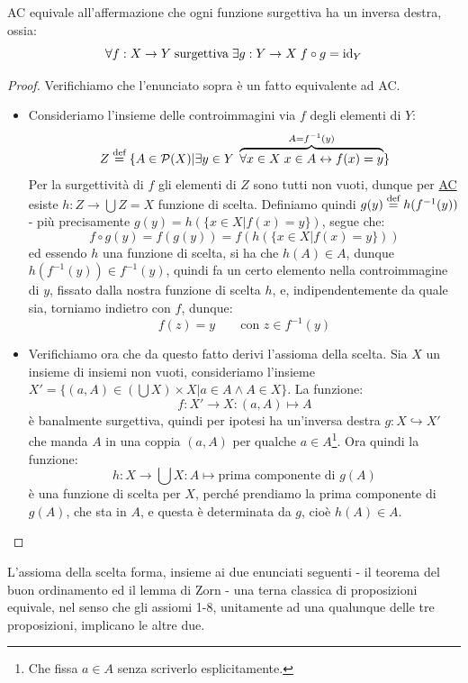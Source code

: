 \begin{note}
	AC equivale all'affermazione che ogni funzione surgettiva ha un inversa destra, ossia:
	\[ \forall f : X \rightarrow Y \; \text{surgettiva}\;\exists g : Y \rightarrow X \; f \circ g = \operatorname{id}_Y
		\]
\end{note}

\begin{proof}
	Verifichiamo che l'enunciato sopra \`e un fatto equivalente ad AC.
	\begin{itemize}
		\item[$\boxed{\Longrightarrow}$] Consideriamo l'insieme delle controimmagini via $f$ degli elementi di $Y$:
		\[ Z \overset{\text{def}}{=} \{A \in \mathcal{P}(X) | \exists y \in Y \; \overbrace{\forall x \in X \; x \in A \leftrightarrow f(x) = y}^{A = f^{-1}(y)}\}
			\]
		Per la surgettivit\`a di $f$ gli elementi di $Z$ sono tutti non vuoti, dunque per \hyperref[ax9]{AC} esiste $h : Z \rightarrow \bigcup Z = X$ funzione di scelta.
		Definiamo quindi $g(y) \overset{\text{def}}{=} h(f^{-1}(y))$ - pi\`u precisamente $g(y) = h(\{x \in X | f(x)  = y\})$, segue che:
		\[ f \circ g(y) = f(g(y)) = f(h(\{x \in X | f(x)  = y\}))
			\]
		ed essendo $h$ una funzione di scelta, si ha che $h(A) \in A$, dunque $h(f^{-1}(y)) \in f^{-1}(y)$, quindi fa un certo elemento nella controimmagine di $y$, fissato dalla nostra funzione di scelta $h$, e, indipendentemente da quale sia, torniamo indietro con $f$, dunque:
		\[ f(z) = y \qquad \text{con $z \in f^{-1}(y)$}
			\]
		\item[$\boxed{\Longleftarrow}$] Verifichiamo ora che da questo fatto derivi l'assioma della scelta. Sia $X$ un insieme di insiemi non vuoti, consideriamo l'insieme $X' = \{(a,A) \in \left(\bigcup X\right) \times X | a \in A \land A \in X\}$.
		La funzione:
		\[ f : X' \rightarrow X : (a,A) \mapsto A
			\]
		\`e banalmente surgettiva, quindi per ipotesi ha un'inversa destra $g : X \hookrightarrow X'$ che manda $A$ in una coppia $(a,A)$ per qualche $a \in A$\footnote{Che fissa $a \in A$ senza scriverlo esplicitamente.}.
		Ora quindi la funzione:
		\[ h : X \rightarrow \bigcup X : A \mapsto \text{prima componente di $g(A)$}
			\]
		\`e una funzione di scelta per $X$, perch\'e prendiamo la prima componente di $g(A)$, che sta in $A$, e questa \`e determinata da $g$, cio\`e $h(A) \in A$.
	\end{itemize}
\end{proof}

L'assioma della scelta forma, insieme ai due enunciati seguenti - il teorema del buon ordinamento ed il lemma di Zorn - una terna classica di proposizioni equivale, nel senso che gli assiomi 1-8, unitamente ad una qualunque delle tre proposizioni, implicano le altre due.


